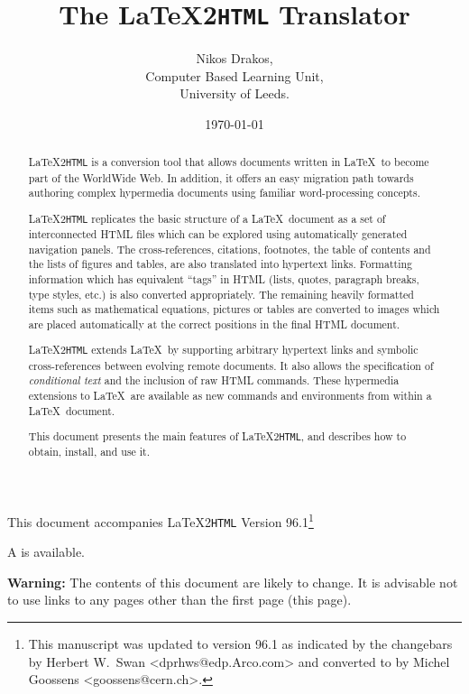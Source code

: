 \documentclass[dvips]{article}
\newcommand{\latextohtml}{\LaTeX 2\texttt{HTML}}
\newcommand{\Email}[1]{{\ttfamily <#1>}}%
\begin{document}
\sloppy
\title{The \latextohtml{} Translator}
\author{Nikos Drakos,\\ Computer Based Learning Unit,\\ University of
Leeds.}
\date{\today}
\maketitle 

\centerline{\large This document accompanies \latextohtml{}
Version 96.1\footnote{This manuscript was updated to version 96.1
as indicated by the changebars by Herbert W.\ Swan
\Email{dprhws@edp.Arco.com} and converted to \LaTeXe{} by Michel
Goossens \Email{goossens@cern.ch}.}}

\begin{htmlonly}
A 
is available. 

\textbf{Warning:} The contents of this document are likely to change.
It is advisable not to use links to any pages other than the first
page (this page).
\end{htmlonly}

\begin{abstract} 
\latextohtml{} is a conversion tool that allows documents
written in \LaTeX\  to become part of the WorldWide Web.
In addition, it offers an easy migration path towards
authoring complex hypermedia documents using
familiar word-processing concepts.

\latextohtml{} replicates the basic structure of a \LaTeX\  document 
as a set of interconnected HTML files which can be explored using
automatically generated navigation panels. 
The cross-references, citations, footnotes, the table of contents and the lists
of figures and tables, are also translated into hypertext links. Formatting
information which has equivalent ``tags'' in HTML (lists, quotes, paragraph
breaks, type styles, etc.) is also converted appropriately. 
The remaining heavily formatted items
such as mathematical equations, pictures or tables are converted to images
which are placed automatically at the correct positions in the
final HTML document.

\latextohtml{} extends \LaTeX\  by supporting arbitrary hypertext links 
and symbolic cross-references between evolving 
remote documents. It also allows the specification
of \emph{conditional text} and the inclusion of raw HTML commands.
These hypermedia extensions to \LaTeX\  are available as 
new commands and environments from within a \LaTeX\  document.

This document presents the main features of \latextohtml{}, and
describes how to obtain, install, and use it.
\end{abstract}
\end{document}
